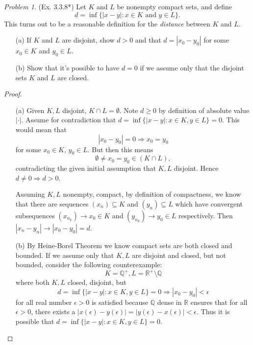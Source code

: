 \documentclass[11pt,twoside, reqno]{amsart}
\theoremstyle{remark}
\newtheorem{Prob}{Problem}
\def\R{\mathbb R}
\def\Q{\mathbb Q}
\renewcommand{\implies}{\Rightarrow}
\begin{document}
\begin{Prob}(Ex. 3.3.8*) Let $K$ and $L$ be nonempty compact sets, and define
$$
    d = \inf \{|x-y| : x \in K \text{ and } y \in L\}.
$$
This turns out to be a reasonable definition for the \textit{distance} between $K$ and $L$.
\begin{enumerate}
    \item [(a)] If $K$ and $L$ are disjoint, show $d > 0$ and that $d = |x_0 - y_0|$ for some $x_0 \in K$ and $y_0 \in L$.
    \item [(b)] Show that it's possible to have $d = 0$ if we assume only that the disjoint sets $K$ and $L$ are closed.
\end{enumerate}
\end{Prob}

\begin{proof}
\begin{enumerate}
    \item [(a)] Given $K, L$ disjoint, $K \cap L = \emptyset$. Note $d \geq 0$ by definition of absolute value $|\cdot|$. Assume for contradiction that $d = \inf\{|x-y|: x \in K, y \in L\} = 0$. This would mean that
    $$
        |x_0 - y_0| = 0 \implies x_0 = y_0
    $$
    for some $x_0 \in K$, $y_0 \in L$. But then this means
    $$
        \emptyset \neq x_0 = y_0 \in (K \cap L),
    $$
    contradicting the given initial assumption that $K, L$ disjoint. Hence $d \neq 0 \implies d > 0$. 
    
    Assuming $K,L$ nonempty, compact, by definition of compactness, we know that there are sequences $(x_n) \subseteq K$ and $(y_n) \subseteq L$ which have convergent subsequences $(x_{n_k}) \to x_0 \in K$ and $(y_{n_k}) \to y_0 \in L$ respectively. Then $|x_n - y_n| \to |x_0-y_0| = d$.
    \item [(b)] By Heine-Borel Theorem we know compact sets are both closed and bounded. If we assume only that $K,L$ are disjoint and closed, but not bounded, consider the following counterexample:
    $$
        K = \Q^+, L = \R^+ \setminus \Q
    $$
    where both $K, L$ closed, disjoint, but
    $$
        d = \inf \{|x - y| : x \in K, y \in L\} = 0 \implies |x_0 - y_0| < \epsilon
    $$
    for all real number $\epsilon > 0$ is satisfied because $\Q$ dense in $\R$ ensures that for all $\epsilon > 0$, there exists a $|x(\epsilon)-y(\epsilon)| = |y(\epsilon)-x(\epsilon)| < \epsilon$. Thus it is possible that $d = \inf \{|x - y| : x \in K, y \in L\} = 0$.
\end{enumerate}

\end{proof}
\end{document}
